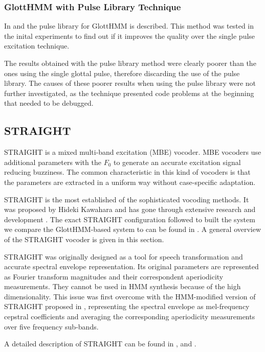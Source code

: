 \subsubsection{GlottHMM with Pulse Library Technique}
\label{vocoders_glott_pulse_library}
In \cite{TuomoMSc} and \cite{manuMSc} the pulse library for GlottHMM is described.
%
This method was tested in the inital experiments to find out if it improves the quality over the single pulse excitation technique.

The results obtained with the pulse library method were clearly poorer than the ones using the single glottal pulse, therefore discarding the use of the pulse library.
%
The causes of these poorer results when using the pulse library were not further investigated, as the technique presented code problems at the beginning that needed to be debugged.

\subsection{STRAIGHT}
\label{vocoders_straight}
STRAIGHT is a mixed multi-band excitation (MBE) vocoder.
%
MBE vocoders use additional parameters with the $F_{0}$ to generate an accurate excitation signal reducing buzziness.
%
The common characteristic in this kind of vocoders is that the parameters are extracted in a uniform way without case-specific adaptation.

STRAIGHT is the most established of the sophisticated vocoding methods.
%
It was proposed by Hideki Kawahara \cite{kawahara1997speech} and has gone through extensive research and development \cite{kawahara1999restructuring}. The exact STRAIGHT configuration followed to built the system we compare the GlottHMM-based system to can be found in \cite{karhila_jstsp_14}. A general overview of the STRAIGHT vocoder is given in this section.

STRAIGHT was originally designed as a tool for speech transformation and accurate spectral envelope representation.
%
Its original parameters are represented as Fourier transform magnitudes and their correspondent aperiodicity measurements.
%
They cannot be used in HMM synthesis because of the high dimensionality. 
%
This issue was first overcome with the HMM-modified version of STRAIGHT proposed in \cite{heiga2007details}, representing the spectral envelope as mel-frequency cepstral coefficients and averaging the corresponding aperiodicity measurements over five frequency sub-bands.


A detailed description of STRAIGHT can be found in \cite{kawahara1997speech}, \cite{heiga2007details} and \cite{manuMSc}.

